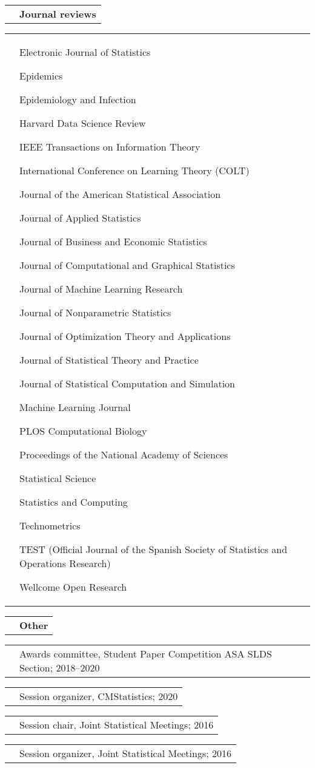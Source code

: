 \documentclass[11pt,letterpaper]{minimal/moderncv}
\makeatletter
\newcommand{\bolditem}[1]{\cvitem{}{\textbf{#1}}}
\renewcommand*{\cvitem}[2]{%
  \begin{tabular}{@{}p{\hintscolumnwidth}@{\hspace{\separatorcolumnwidth}}%
    p{\maincolumnwidth}@{}}%
    \raggedleft {#1} &  {#2}%
  \end{tabular}%
}
\makeatother
\begin{document}
\vspace{6pt}
\bolditem{Journal reviews}
\cvitem{}{\begin{itemize*}[label=\raisebox{0.4ex}{\tiny$\bullet$}]
\item[] \hspace{-.8ex}Electronic Journal of Statistics
\item Epidemics
\item Epidemiology and Infection 
\item Harvard Data Science Review
\item IEEE Transactions on Information Theory
\item International Conference on Learning Theory (COLT)
\item Journal of the American Statistical Association
\item Journal of Applied Statistics
\item Journal of Business and Economic Statistics
\item Journal of Computational and Graphical Statistics
\item Journal of Machine Learning Research
\item Journal of Nonparametric Statistics
\item Journal of Optimization Theory and Applications
\item Journal of Statistical Theory and Practice
\item Journal of Statistical Computation and Simulation
\item Machine Learning Journal
\item PLOS Computational Biology
\item Proceedings of the National Academy of Sciences
\item Statistical Science
\item Statistics and Computing
\item Technometrics
\item TEST (Official Journal of the Spanish Society of Statistics and Operations Research)
\item Wellcome Open Research
\end{itemize*}}


\vspace{6pt}
\bolditem{Other}
\cvitem{}{Awards committee, Student Paper Competition ASA SLDS
  Section; 2018--2020}
\cvitem{}{Session organizer, CMStatistics; 2020}
\cvitem{}{Session chair, Joint Statistical Meetings; 2016}
\cvitem{}{Session organizer, Joint Statistical Meetings; 2016}
\end{document}

